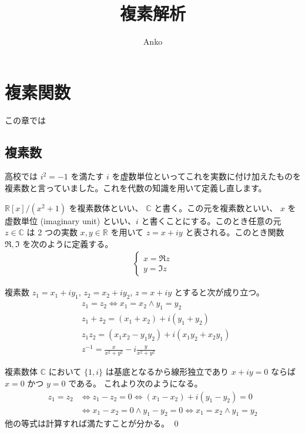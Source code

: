 \documentclass[uplatex,dvipdfmx,a4paper,11pt]{jlreq}
\title{複素解析}
\author{Anko}
\makeatletter
\newcommand{\CC}{\mathbb{C}}
\newcommand{\RR}{\mathbb{R}}
\theoremstyle{definition}
\renewenvironment{proof}[1][\proofname]{\par
  \normalfont
  \topsep6\p@\@plus6\p@ \trivlist
  \item[\hskip\labelsep{\bfseries #1}\@addpunct{\bfseries}]\ignorespaces\quad\par
}{%
  \qed\endtrivlist\@endpefalse
}
\renewcommand\proofname{証明}
\makeatother
\begin{document}
\maketitle
\tableofcontents
\clearpage

\section{複素関数}
この章では
\subsection{複素数}
高校では $i^2 = -1$ を満たす $i$ を虚数単位といってこれを実数に付け加えたものを複素数と言っていました。これを代数の知識を用いて定義し直します。

\begin{definition}
  $\RR[x]/(x^2 + 1)$ を複素数体といい、 $\CC$ と書く。この元を複素数といい、 $x$ を虚数単位 (imaginary unit) といい、$i$ と書くことにする。このとき任意の元 $z\in\CC$ は 2 つの実数 $x, y\in\RR$ を用いて $z = x + iy$ と表される。このとき関数 $\Re, \Im$ を次のように定義する。
  \begin{align}
    \begin{cases}
      x = \Re z \\
      y = \Im z
    \end{cases}
  \end{align}
\end{definition}

\begin{proposition}
  複素数 $z_1 = x_1 + iy_1$, $z_2 = x_2 + iy_2$, $z = x + iy$ とすると次が成り立つ。
  \begin{align}
     & z_1 = z_2 \iff x_1 = x_2 \land y_1 = y_2            \\
     & z_1 + z_2 = (x_1 + x_2) + i(y_1 + y_2)              \\
     & z_1z_2 = (x_1x_2 - y_1y_2) + i(x_1y_2 + x_2y_1)     \\
     & z^{-1} = \frac{x}{x^2 + y^2} - i\frac{y}{x^2 + y^2}
  \end{align}
\end{proposition}
\begin{proof}
  複素数体 $\CC$ において $\lbrace 1, i\rbrace$ は基底となるから線形独立であり $x + iy = 0$ ならば $x = 0$ かつ $y = 0$ である。
  これより次のようになる。
  \begin{align}
    z_1 = z_2 & \iff z_1 - z_2 = 0 \iff (x_1 - x_2) + i(y_1 - y_2) = 0                \\
              & \iff x_1 - x_2 = 0 \land y_1 - y_2 = 0 \iff x_1 = x_2 \land y_1 = y_2
  \end{align}
  他の等式は計算すれば満たすことが分かる。
\end{proof}
\end{document}
